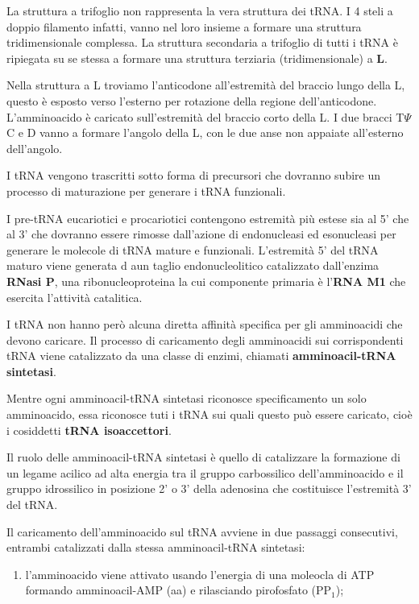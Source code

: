 \documentclass[11pt]{book}
\begin{document}
La struttura a trifoglio non rappresenta la vera struttura dei tRNA. I 4
steli a doppio filamento infatti, vanno nel loro insieme a formare una
struttura tridimensionale complessa. La struttura secondaria a trifoglio
di tutti i tRNA è ripiegata su se stessa a formare una struttura
terziaria (tridimensionale) a \textbf{L}.

Nella struttura a L troviamo l'anticodone all'estremità del braccio
lungo della L, questo è esposto verso l'esterno per rotazione della
regione dell'anticodone. L'amminoacido è caricato sull'estremità del
braccio corto della L. I due bracci T\(\Psi\)C e D vanno a formare
l'angolo della L, con le due anse non appaiate all'esterno dell'angolo.

I tRNA vengono trascritti sotto forma di precursori che dovranno subire
un processo di maturazione per generare i tRNA funzionali.

I pre-tRNA eucariotici e procariotici contengono estremità più estese
sia al 5' che al 3' che dovranno essere rimosse dall'azione di
endonucleasi ed esonucleasi per generare le molecole di tRNA mature e
funzionali. L'estremità 5' del tRNA maturo viene generata d aun taglio
endonucleolitico catalizzato dall'enzima \textbf{RNasi P}, una
ribonucleoproteina la cui componente primaria è l'\textbf{RNA M1} che
esercita l'attività catalitica.

I tRNA non hanno però alcuna diretta affinità specifica per gli
amminoacidi che devono caricare. Il processo di caricamento degli
amminoacidi sui corrispondenti tRNA viene catalizzato da una classe di
enzimi, chiamati \textbf{amminoacil-tRNA sintetasi}.

Mentre ogni amminoacil-tRNA sintetasi riconosce specificamento un solo
amminoacido, essa riconosce tuti i tRNA sui quali questo può essere
caricato, cioè i cosiddetti \textbf{tRNA isoaccettori}.

Il ruolo delle amminoacil-tRNA sintetasi è quello di catalizzare la
formazione di un legame acilico ad alta energia tra il gruppo
carbossilico dell'amminoacido e il gruppo idrossilico in posizione 2' o
3' della adenosina che costituisce l'estremità 3' del tRNA.

Il caricamento dell'amminoacido sul tRNA avviene in due passaggi
consecutivi, entrambi catalizzati dalla stessa amminoacil-tRNA
sintetasi:

\begin{enumerate}
\def\labelenumi{\arabic{enumi}.}
\itemsep1pt\parskip0pt
\item
  l'amminoacido viene attivato usando l'energia di una moleocla di ATP
  formando amminoacil-AMP (aa) e rilasciando pirofosfato (PP\(_1\));
\end{enumerate}
\end{document}
